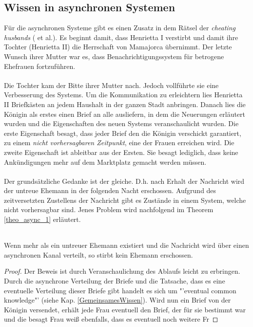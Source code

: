 \subsection{Wissen in asynchronen Systemen}
\label{wissen_sync}
Für die asynchronen Systeme gibt es einen Zusatz in dem Rätsel der \textit{cheating husbands} (\cite{moses1986cheating} et al.). Es beginnt damit, dass Henrietta I verstirbt und damit ihre Tochter (Henrietta II) die Herrschaft von Mamajorca übernimmt. Der letzte Wunsch ihrer Mutter war es, dass Benachrichtigungssystem für betrogene Ehefrauen fortzuführen. \\\\
Die Tochter kam der Bitte ihrer Mutter nach. Jedoch vollführte sie eine Verbesserung des Systems. Um die Kommunikation zu erleichtern lies Henrietta II Briefkästen an jedem Haushalt in der ganzen Stadt anbringen. Danach lies die Königin als erstes einen Brief an alle ausliefern, in dem die Neuerungen erläutert wurden und die Eigenschaften des neuen Systems veranschaulicht wurden. Die erste Eigenschaft besagt, dass jeder Brief den die Königin verschickt garantiert, zu einem \textit{nicht vorhersagbaren Zeitpunkt}, eine der Frauen erreichen wird. Die zweite Eigenschaft ist  ableitbar aus der Ersten. Sie besagt lediglich, dass keine Ankündigungen mehr auf dem Marktplatz gemacht werden müssen.\\\\
Der grundsätzliche Gedanke ist der gleiche. D.h. nach Erhalt der Nachricht wird der untreue Ehemann in der folgenden Nacht erschossen. Aufgrund des zeitversetzten Zustellens der Nachricht gibt es Zustände in einem System, welche nicht vorhersagbar sind. Jenes Problem wird nachfolgend im Theorem \ref{theo_async_1} erläutert.
\begin{theorem}\\
\label{theo_async_1}
Wenn mehr als ein untreuer Ehemann existiert und die Nachricht wird über einen asynchronen Kanal verteilt, so stirbt kein Ehemann erschossen.
\end{theorem}
\begin{proof}
Der Beweis ist durch Veranschaulichung des Ablaufs leicht zu erbringen. Durch die asynchrone Verteilung der Briefe und die Tatsache, dass es eine eventuelle Verteilung dieser Briefe gibt handelt es sich um "'eventual common knowledge"' (siehe Kap. \ref{GemeinsamesWissen}). Wird nun ein Brief von der Königin versendet, erhält jede Frau eventuell den Brief, der für sie bestimmt war und die besagt Frau weiß ebenfalls, dass es eventuell noch weitere Fr%
\end{proof}

